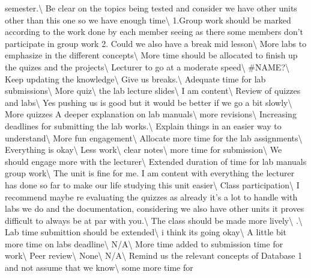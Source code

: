 \documentclass[
]{article}
\begin{document}
semester.\textbackslash{} \hline Be clear on the topics being tested and
consider we have other units other than this one so we have enough
time\textbackslash{} \hline 1.Group work should be marked according to
the work done by each member seeing as there some members don't
participate in group work 2. Could we also have a break mid
lesson\textbackslash{} \hline More labs to emphasize in the different
concepts\textbackslash{} \hline More time should be allocated to finish
up the quizes and the projects\textbackslash{} \hline Lecturer to go at
a moderate speed\textbackslash{} \hline \#NAME?\textbackslash{} \hline
Keep updating the knowledge\textbackslash{} \hline Give us
breaks.\textbackslash{} \hline Adequate time for lab
submissions\textbackslash{} \hline More quiz\textbackslash{} \hline the
lab lecture slides\textbackslash{} \hline I am content\textbackslash{}
\hline Review of quizzes and labs\textbackslash{} \hline Yes pushing us
is good but it would be better if we go a bit slowly\textbackslash{}
\hline More quizzes A deeper explanation on lab manuals\textbackslash{}
\hline more revisions\textbackslash{} \hline Increasing deadlines for
submitting the lab works.\textbackslash{} \hline Explain things in an
easier way to understand\textbackslash{} \hline More fun
engagement\textbackslash{} \hline Allocate more time for the lab
assignments\textbackslash{} \hline Everything is okay\textbackslash{}
\hline Less work\textbackslash{} \hline clear \vphantom{1}
notes\textbackslash{} \hline more time for submission\textbackslash{}
\hline We should engage more with the lecturer\textbackslash{} \hline
Extended duration of time for lab manuals group work\textbackslash{}
\hline The unit is fine for me. I am content with everything the
lecturer has done so far to make our life studying this unit
easier\textbackslash{} \hline Class participation\textbackslash{} \hline
I recommend maybe re evaluating the quizzes as already it's a lot to
handle with labs we do and the documentation, considering we also have
other units it proves difficult to always be at par with
you.\textbackslash{} \hline The class should be made more
lively\textbackslash{} \hline .\textbackslash{} \hline Lab time
submittion should be extended\textbackslash{} \hline i think its going
okay\textbackslash{} \hline A little bit more time on labs
deadline\textbackslash{} \hline N/A\textbackslash{} \hline More time
added to submission time for work\textbackslash{} \hline Peer
review\textbackslash{} \hline None\textbackslash{} \hline
N/A\textbackslash{} \hline Remind us the relevant concepts of Database 1
and not assume that we know\textbackslash{} \hline some more time for
\end{document}

